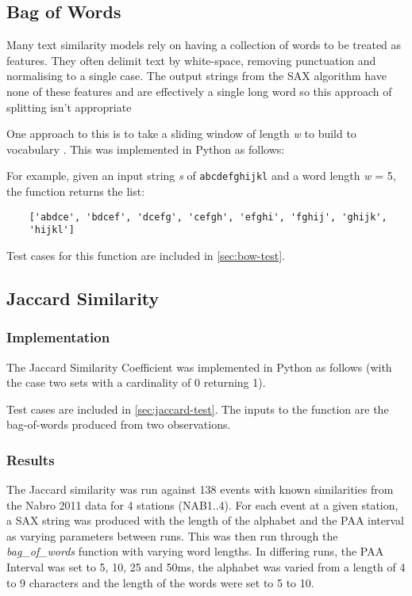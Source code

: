 \documentclass[../report.tex]{subfiles}
\begin{document}
\subsection{Bag of Words} \label{sec:bow}
	Many text similarity models rely on having a collection of words to be treated as features.  They often delimit text by white-space, removing punctuation and normalising to a single case.  The output strings from the SAX algorithm have none of these features and are effectively a single long word so this approach of splitting isn't appropriate
	
	One approach to this is to take a sliding window of length \textit{w} to build to vocabulary \citep{sax-hot}.  This was implemented in Python as follows:



	For example, given an input string \textit{s} of \verb|abcdefghijkl| and a word length \textit{w} = 5, the function returns the list: 
\begin{verbatim}
	['abdce', 'bdcef', 'dcefg', 'cefgh', 'efghi', 'fghij', 'ghijk', 
	'hijkl']
\end{verbatim}

	Test cases for this function are included in \cref{sec:bow-test}.


\subsection{Jaccard Similarity} \label{sec:jaccard}
\subsubsection{Implementation}
	The Jaccard Similarity Coefficient was implemented in Python as follows (with the case two sets with a cardinality of 0 returning 1).



	Test cases are included in \cref{sec:jaccard-test}.  The inputs to the function are the bag-of-words produced from two observations.
	
\subsubsection{Results}

	The Jaccard similarity was run against 138 events with known similarities from the Nabro 2011 data for 4 stations (NAB1..4).  For each event at a given station, a SAX string was produced with the length of the alphabet and the PAA interval as varying parameters between runs.  This was then run through the \textit{bag\_of\_words} function with varying word lengths.  In differing runs, the PAA Interval was set to 5, 10, 25 and 50ms, the alphabet was varied from a length of 4 to 9 characters and the length of the words were set to 5 to 10.
	
\end{document}
